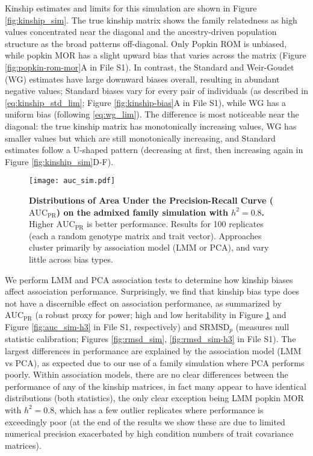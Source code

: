 \documentclass[9pt,twocolumn,twoside]{gsajnl}
\newcommand{\rmsd}{\text{SRMSD}_p}
\newcommand{\auc}{\text{AUC}_\text{PR}}
\begin{document}
Kinship estimates and limits for this simulation are shown in Figure \ref{fig:kinship_sim}.
The true kinship matrix shows the family relatedness as high values concentrated near the diagonal and the ancestry-driven population structure as the broad patterns off-diagonal.
Only Popkin ROM is unbiased, while popkin MOR has a slight upward bias that varies across the matrix (Figure \ref*{fig:popkin-rom-mor}A in File S1).
In contrast, the Standard and Weir-Goudet (WG) estimates have large downward biases overall, resulting in abundant negative values; Standard biases vary for every pair of individuals (as described in \cref{eq:kinship_std_lim}; Figure \ref*{fig:kinship-bias}A in File S1), while WG has a uniform bias (following \cref{eq:wg_lim}).
The difference is most noticeable near the diagonal: the true kinship matrix has monotonically increasing values, WG has smaller values but which are still monotonically increasing, and Standard estimates follow a U-shaped pattern (decreasing at first, then increasing again in Figure \ref{fig:kinship_sim}D-F).

\begin{figure}[tb]
  \centering
  \texttt{[image: auc\_sim.pdf]}
  \caption{
    {\bf Distributions of Area Under the Precision-Recall Curve ($\auc$) on the admixed family simulation with $h^2=0.8$.}
    Higher $\auc$ is better performance.
    Results for 100 replicates (each a random genotype matrix and trait vector).
    Approaches cluster primarily by association model (LMM or PCA), and vary little across bias types.
  }
  \label{fig:auc_sim}
\end{figure}

We perform LMM and PCA association tests to determine how kinship biases affect association performance.
Surprisingly, we find that kinship bias type does not have a discernible effect on association performance, as summarized by $\auc$ (a robust proxy for power; high and low heritability in Figure \ref{fig:auc_sim} and Figure \ref*{fig:auc_sim-h3} in File S1, respectively) and $\rmsd$ (measures null statistic calibration; Figures \ref*{fig:rmsd_sim}, \ref*{fig:rmsd_sim-h3} in File S1).
The largest differences in performance are explained by the association model (LMM vs PCA), as expected due to our use of a family simulation where PCA performs poorly.
Within association models, there are no clear differences between the performance of any of the kinship matrices, in fact many appear to have identical distributions (both statistics), the only clear exception being LMM popkin MOR with $h^2=0.8$, which has a few outlier replicates where performance is exceedingly poor (at the end of the results we show these are due to limited numerical precision exacerbated by high condition numbers of trait covariance matrices).
\end{document}
